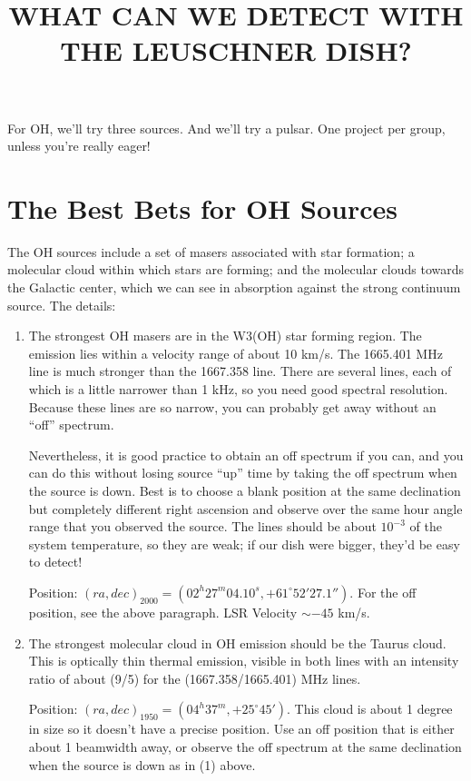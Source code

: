 \documentclass[11pt,preprint]{aastex}
\begin{document}
\title {WHAT CAN WE DETECT WITH THE LEUSCHNER DISH?}

	For OH, we'll try three sources. And we'll try a pulsar. One
project per group, unless you're really eager!

\section{The Best Bets for OH Sources}

	The OH sources include a set of masers associated with star
formation; a molecular cloud within which stars are forming; and the
molecular clouds towards the Galactic center, which we can see in
absorption against the strong continuum source.  The details:
\begin{enumerate}

\item The strongest OH masers are in the W3(OH) star forming region. 
The emission lies within a velocity range of about 10 km/s.  The
1665.401 MHz line is much stronger than the 1667.358 line.  There are
several lines, each of which is a little narrower than 1 kHz, so you
need good spectral resolution.  Because these lines are so narrow, you
can probably get away without an ``off'' spectrum.

	Nevertheless, it is good practice to obtain an off spectrum if
you can, and you can do this without losing source ``up'' time by taking
the off spectrum when the source is down.  Best is to choose a blank
position at the same declination but completely different right
ascension and observe over the same hour angle range that you observed
the source.  The lines should be about $10^{-3}$ of the system
temperature, so they are weak; if our dish were bigger, they'd be easy
to detect!

Position: $(ra, dec)_{2000} = (02^h27^m04.10^s, +61^\circ 52' 27.1'')$. 
For the off position, see the above paragraph.  LSR Velocity $\sim -45$
km/s.

\item The strongest molecular cloud in OH emission should be the Taurus
cloud.  This is optically thin thermal emission, visible in both lines
with an intensity ratio of about (9/5) for the (1667.358/1665.401) MHz
lines. 

Position: $(ra, dec)_{1950} = (04^h37^m, +25^\circ 45')$. This cloud is
about 1 degree in size so it doesn't have a precise position. Use an off
position that is either about 1 beamwidth away, or observe the off
spectrum at the same declination when the source is down as in (1) above.


\end{enumerate}
\end{document}
